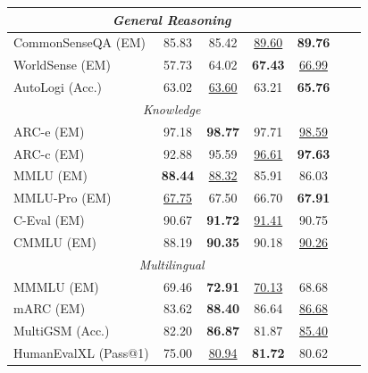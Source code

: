 \begin{table}[h]
{\begin{tabular}{lcccccc}
\midrule
\multicolumn{5}{c}{\textit{General Reasoning}} \\
\midrule
CommonSenseQA (EM) & 85.83 & 85.42 & \underline{89.60} & \textbf{89.76} \\
WorldSense (EM) & 57.73 & 64.02 & \textbf{67.43} & \underline{66.99}\\
AutoLogi (Acc.) & 63.02 & \underline{63.60} & 63.21 & \textbf{65.76}\\
\midrule
\multicolumn{5}{c}{\textit{Knowledge}} \\
\midrule
ARC-e (EM) & 97.18 & \textbf{98.77} & 97.71 & \underline{98.59} \\
ARC-c (EM) & 92.88 & 95.59 & \underline{96.61} & \textbf{97.63} \\
MMLU (EM) & \textbf{88.44} & \underline{88.32} & 85.91 & 86.03\\
MMLU-Pro (EM) & \underline{67.75} & 67.50 & 66.70 & \textbf{67.91}\\
C-Eval (EM) & 90.67 & \textbf{91.72} & \underline{91.41} & 90.75\\
CMMLU (EM) & 88.19 & \textbf{90.35} & 90.18 & \underline{90.26}\\
\midrule
\multicolumn{5}{c}{\textit{Multilingual}} \\
\midrule
MMMLU (EM) & 69.46 & \textbf{72.91} & \underline{70.13} & 68.68\\
mARC (EM) & 83.62 & \textbf{88.40} & 86.64 & \underline{86.68} \\
MultiGSM (Acc.) & 82.20 & \textbf{86.87} & 81.87 & \underline{85.40} \\
HumanEvalXL (Pass@1) & 75.00 & \underline{80.94} & \textbf{81.72} & 80.62 \\
\bottomrule
\end{tabular}}
\end{table}




